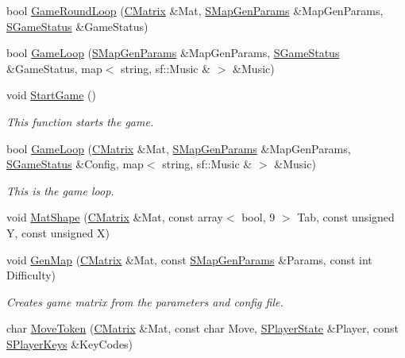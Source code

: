 \begin{DoxyCompactItemize}
bool \hyperlink{namespace_chase_game_acb136d1f2b7073d2dc61bc2e2d65b931}{Game\-Round\-Loop} (\hyperlink{namespace_chase_game_a469449f9237e59efce3982127366c550}{C\-Matrix} \&Mat, \hyperlink{struct_chase_game_1_1_s_map_gen_params}{S\-Map\-Gen\-Params} \&Map\-Gen\-Params, \hyperlink{struct_chase_game_1_1_s_game_status}{S\-Game\-Status} \&Game\-Status)
\item 
bool \hyperlink{namespace_chase_game_a1ca6f3f9092b35d9bea0343fd032d7f0}{Game\-Loop} (\hyperlink{struct_chase_game_1_1_s_map_gen_params}{S\-Map\-Gen\-Params} \&Map\-Gen\-Params, \hyperlink{struct_chase_game_1_1_s_game_status}{S\-Game\-Status} \&Game\-Status, map$<$ string, sf\-::\-Music \& $>$ \&Music)
\item 
void \hyperlink{namespace_chase_game_a528073d13296b3cf84a6ae07c3550e74}{Start\-Game} ()
\begin{DoxyCompactList}\small\item\em This function starts the game. \end{DoxyCompactList}\item 
bool \hyperlink{namespace_chase_game_a978204f0ec269a6fa5f43bb523d84e57}{Game\-Loop} (\hyperlink{namespace_chase_game_a469449f9237e59efce3982127366c550}{C\-Matrix} \&Mat, \hyperlink{struct_chase_game_1_1_s_map_gen_params}{S\-Map\-Gen\-Params} \&Map\-Gen\-Params, \hyperlink{struct_chase_game_1_1_s_game_status}{S\-Game\-Status} \&Config, map$<$ string, sf\-::\-Music \& $>$ \&Music)
\begin{DoxyCompactList}\small\item\em This is the game loop. \end{DoxyCompactList}\item 
void \hyperlink{namespace_chase_game_ac12626138d0e2c49669eba73ffb4e4b7}{Mat\-Shape} (\hyperlink{namespace_chase_game_a469449f9237e59efce3982127366c550}{C\-Matrix} \&Mat, const array$<$ bool, 9 $>$ Tab, const unsigned Y, const unsigned X)
\item 
void \hyperlink{namespace_chase_game_a15617c8a111cd66bf5d24fd1e82a119d}{Gen\-Map} (\hyperlink{namespace_chase_game_a469449f9237e59efce3982127366c550}{C\-Matrix} \&Mat, const \hyperlink{struct_chase_game_1_1_s_map_gen_params}{S\-Map\-Gen\-Params} \&Params, const int Difficulty)
\begin{DoxyCompactList}\small\item\em Creates game matrix from the parameters and config file. \end{DoxyCompactList}\item 
char \hyperlink{namespace_chase_game_ab829e8344fcd18592d9a4ae2800bd2eb}{Move\-Token} (\hyperlink{namespace_chase_game_a469449f9237e59efce3982127366c550}{C\-Matrix} \&Mat, const char Move, \hyperlink{struct_chase_game_1_1_s_player_state}{S\-Player\-State} \&Player, const \hyperlink{struct_chase_game_1_1_s_player_keys}{S\-Player\-Keys} \&Key\-Codes)

\end{DoxyCompactItemize}
